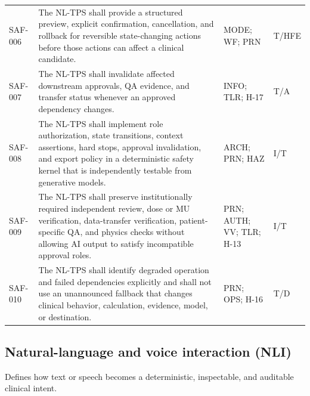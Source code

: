 \documentclass[11pt,letterpaper]{article}
\begin{document}
\begin{small}
\begin{longtable}{@{}L{0.0806\textwidth}L{0.5386\textwidth}L{0.1868\textwidth}L{0.1140\textwidth}@{}}
\addlinespace[2pt]
SAF-006 & The NL-TPS shall provide a structured preview, explicit confirmation, cancellation, and rollback for reversible state-changing actions before those actions can affect a clinical candidate. & MODE; WF; PRN & T\slash\allowbreak{}HFE \\
\addlinespace[2pt]
SAF-007 & The NL-TPS shall invalidate affected downstream approvals, QA evidence, and transfer status whenever an approved dependency changes. & INFO; TLR; H-17 & T\slash\allowbreak{}A \\
\addlinespace[2pt]
SAF-008 & The NL-TPS shall implement role authorization, state transitions, context assertions, hard stops, approval invalidation, and export policy in a deterministic safety kernel that is independently testable from generative models. & ARCH; PRN; HAZ & I\slash\allowbreak{}T \\
\addlinespace[2pt]
SAF-009 & The NL-TPS shall preserve institutionally required independent review, dose or MU verification, data-transfer verification, patient-specific QA, and physics checks without allowing AI output to satisfy incompatible approval roles. & PRN; AUTH; VV; TLR; H-13 & I\slash\allowbreak{}T \\
\addlinespace[2pt]
SAF-010 & The NL-TPS shall identify degraded operation and failed dependencies explicitly and shall not use an unannounced fallback that changes clinical behavior, calculation, evidence, model, or destination. & PRN; OPS; H-16 & T\slash\allowbreak{}D \\
\end{longtable}
\end{small}

\subsection{Natural-language and voice interaction (NLI)}

Defines how text or speech becomes a deterministic, inspectable, and auditable clinical intent.
\end{document}
